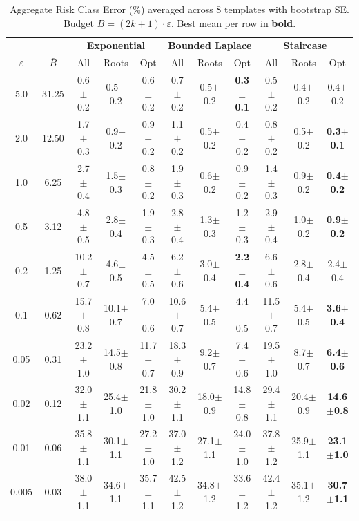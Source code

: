 \providecommand{\pmstd}[1]{{\scriptsize $\pm$#1}}

\begin{table}[t]
\centering
\setlength{\tabcolsep}{2.8pt}
\small
\caption{Aggregate Risk Class Error (\%) averaged across 8 templates with bootstrap SE. Budget $B = (2k+1) \cdot \varepsilon$. Best mean per row in \textbf{bold}.}
\label{tab:rq1_2kplus1_rce}
\begin{tabular}{cc|ccc|ccc|ccc}
\toprule
& & \multicolumn{3}{c|}{\textbf{Exponential}} & \multicolumn{3}{c|}{\textbf{Bounded Laplace}} & \multicolumn{3}{c}{\textbf{Staircase}} \\
$\varepsilon$ & $\bar{B}$ & All & Roots & Opt & All & Roots & Opt & All & Roots & Opt \\
\midrule
5.0 & 31.25 & 0.6\pmstd{0.2} & 0.5\pmstd{0.2} & 0.6\pmstd{0.2} & 0.7\pmstd{0.2} & 0.5\pmstd{0.2} & \textbf{0.3\pmstd{0.1}} & 0.5\pmstd{0.2} & 0.4\pmstd{0.2} & 0.4\pmstd{0.2} \\
2.0 & 12.50 & 1.7\pmstd{0.3} & 0.9\pmstd{0.2} & 0.9\pmstd{0.2} & 1.1\pmstd{0.2} & 0.5\pmstd{0.2} & 0.4\pmstd{0.2} & 0.8\pmstd{0.2} & 0.5\pmstd{0.2} & \textbf{0.3\pmstd{0.1}} \\
1.0 & 6.25 & 2.7\pmstd{0.4} & 1.5\pmstd{0.3} & 0.8\pmstd{0.2} & 1.9\pmstd{0.3} & 0.6\pmstd{0.2} & 0.9\pmstd{0.2} & 1.4\pmstd{0.3} & 0.9\pmstd{0.2} & \textbf{0.4\pmstd{0.2}} \\
0.5 & 3.12 & 4.8\pmstd{0.5} & 2.8\pmstd{0.4} & 1.9\pmstd{0.3} & 2.8\pmstd{0.4} & 1.3\pmstd{0.3} & 1.2\pmstd{0.3} & 2.9\pmstd{0.4} & 1.0\pmstd{0.2} & \textbf{0.9\pmstd{0.2}} \\
0.2 & 1.25 & 10.2\pmstd{0.7} & 4.6\pmstd{0.5} & 4.5\pmstd{0.5} & 6.2\pmstd{0.6} & 3.0\pmstd{0.4} & \textbf{2.2\pmstd{0.4}} & 6.6\pmstd{0.6} & 2.8\pmstd{0.4} & 2.4\pmstd{0.4} \\
0.1 & 0.62 & 15.7\pmstd{0.8} & 10.1\pmstd{0.7} & 7.0\pmstd{0.6} & 10.6\pmstd{0.7} & 5.4\pmstd{0.5} & 4.4\pmstd{0.5} & 11.5\pmstd{0.7} & 5.4\pmstd{0.5} & \textbf{3.6\pmstd{0.4}} \\
0.05 & 0.31 & 23.2\pmstd{1.0} & 14.5\pmstd{0.8} & 11.7\pmstd{0.7} & 18.3\pmstd{0.9} & 9.2\pmstd{0.7} & 7.4\pmstd{0.6} & 19.5\pmstd{1.0} & 8.7\pmstd{0.7} & \textbf{6.4\pmstd{0.6}} \\
0.02 & 0.12 & 32.0\pmstd{1.1} & 25.4\pmstd{1.0} & 21.8\pmstd{1.0} & 30.2\pmstd{1.1} & 18.0\pmstd{0.9} & 14.8\pmstd{0.8} & 29.4\pmstd{1.1} & 20.4\pmstd{0.9} & \textbf{14.6\pmstd{0.8}} \\
0.01 & 0.06 & 35.8\pmstd{1.1} & 30.1\pmstd{1.1} & 27.2\pmstd{1.0} & 37.0\pmstd{1.2} & 27.1\pmstd{1.1} & 24.0\pmstd{1.0} & 37.8\pmstd{1.2} & 25.9\pmstd{1.1} & \textbf{23.1\pmstd{1.0}} \\
0.005 & 0.03 & 38.0\pmstd{1.1} & 34.6\pmstd{1.1} & 35.7\pmstd{1.1} & 42.5\pmstd{1.2} & 34.8\pmstd{1.2} & 33.6\pmstd{1.2} & 42.4\pmstd{1.2} & 35.1\pmstd{1.2} & \textbf{30.7\pmstd{1.1}} \\
\bottomrule
\end{tabular}
\end{table}
